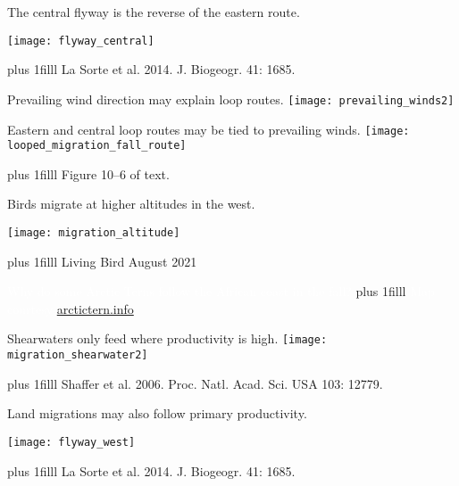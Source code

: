 \documentclass[t]{beamer}
\newcommand\imagecredit[1]{%
	\vskip0pt plus 1filll \tiny #1}%
\begin{document}
{
\begin{frame}[t,plain]{The central flyway is the reverse of the eastern route.}
	\begin{center}
		\texttt{[image: flyway\_central]}
	\end{center}
		
	\imagecredit{\hfill La Sorte et al. 2014. J. Biogeogr. 41: 1685.}
\end{frame}
}


{
\begin{frame}[t,plain]{Prevailing wind direction may explain loop routes.}
	\centering
		\texttt{[image: prevailing\_winds2]}
\end{frame}
}

{
\begin{frame}[t,plain]{Eastern and central loop routes may be tied to prevailing winds.}
	\vspace{-\baselineskip}
	\centering
		\texttt{[image: looped\_migration\_fall\_route]}

	\imagecredit{\hfill Figure 10–6 of text.}
\end{frame}
}

{
\begin{frame}[t,plain]{Birds migrate at higher altitudes in the west.}

\centering
\texttt{[image: migration\_altitude]}
		
	\imagecredit{\hfill Living Bird August 2021}
\end{frame}
}

{
\begin{frame}[t,plain]{\textcolor{white}{Why do some Arctic Terns follow the African coast in the fall?}}
	\imagecredit{\hfill\textcolor{white}{ Map courtesy \url{arctictern.info}}}
\end{frame}
}


{
\begin{frame}[t,plain]{Shearwaters only feed where productivity is high.}
	\vspace{0.5cm}
	\centering
		\texttt{[image: migration\_shearwater2]}

	\imagecredit{Shaffer et al. 2006. Proc. Natl. Acad. Sci. USA 103: 12779.\hfill}
\end{frame}
}


{
\begin{frame}[t,plain]{Land migrations may also follow primary productivity.}
	\begin{center}
		\texttt{[image: flyway\_west]}
	\end{center}


	\imagecredit{\hfill La Sorte et al. 2014. J. Biogeogr. 41: 1685.}
\end{frame}
}
\end{document}
